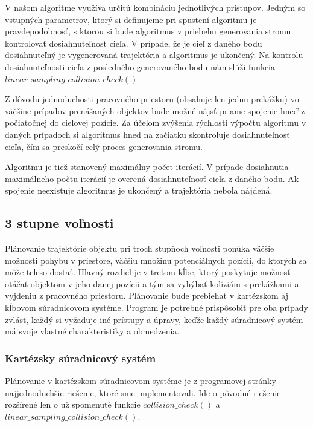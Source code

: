 V našom algoritme využíva určitú kombináciu jednotlivých prístupov.
Jedným so vstupných parametrov, ktorý si definujeme pri spustení algoritmu je pravdepodobnosť, s ktorou si bude algoritmus v priebehu generovania stromu kontrolovať dosiahnuteľnosť cieľa.  V prípade, že je cieľ z daného bodu dosiahnuteľný je vygenerovaná trajektória a algoritmus je ukončený. Na kontrolu dosiahnuteľnosti cieľa z posledného generovaného bodu nám slúži funkcia $ linear\_sampling\_collision\_check()$.

Z dôvodu jednoduchosti pracovného priestoru (obsahuje len jednu prekážku) vo väčšine prípadov prenášaných objektov bude možné nájsť priame spojenie hneď z počiatočnej do cieľovej pozície. Za účelom zvýšenia rýchlosti výpočtu algoritmu v daných prípadoch si algoritmus hneď na začiatku skontroluje dosiahnuteľnosť cieľa, čím sa preskočí celý proces generovania stromu.

Algoritmu je tiež stanovený maximálny počet iterácií. V prípade dosiahnutia maximálneho počtu iterácií je overená dosiahnuteľnosť cieľa z daného bodu. Ak spojenie neexistuje algoritmus je ukončený a trajektória nebola nájdená.

\subsection{3 stupne voľnosti}

Plánovanie trajektórie objektu pri troch stupňoch voľnosti ponúka väčšie možnosti pohybu v priestore, väčšiu množinu potenciálnych pozícií, do ktorých sa môže teleso dostať. Hlavný rozdiel je v treťom kĺbe, ktorý poskytuje možnosť otáčať objektom v jeho danej pozícii a tým sa vyhýbať kolíziám s prekážkami a vyjdeniu z pracovného priestoru. Plánovanie bude prebiehať v kartézskom aj kĺbovom súradnicovom systéme. Program je potrebné prispôsobiť pre oba prípady zvlásť, každý si vyžaduje iné prístupy a úpravy, keďže každý súradnicový systém má svoje vlastné charakteristiky a obmedzenia.

\subsubsection{Kartézsky súradnicový systém}

Plánovanie v kartézskom súradnicovom systéme je z programovej stránky najjednoduchšie riešenie, ktoré sme implementovali. 
Ide o pôvodné riešenie rozšírené len o už spomenuté funkcie $ collision\_check() $ a $ linear\_sampling\_collision\_check()$. 

